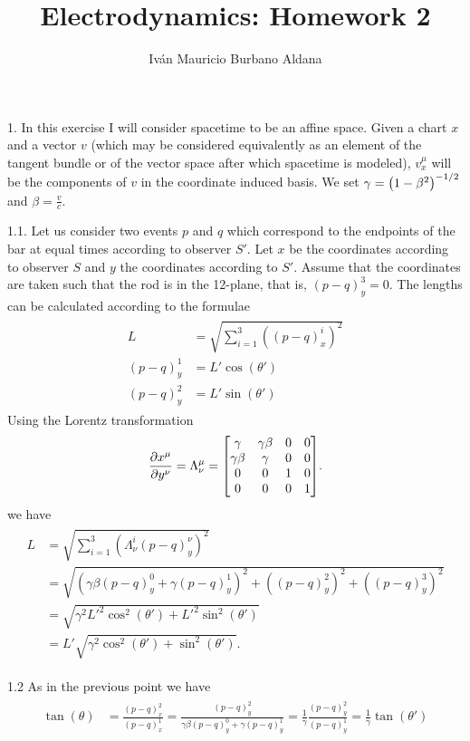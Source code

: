 \documentclass{article}
\title{Electrodynamics: Homework 2}
\author{Iván Mauricio Burbano Aldana}
\begin{document}
\maketitle

1. In this exercise I will consider spacetime to be an affine space. Given a chart $x$ and a vector $v$ (which may be considered equivalently as an element of the tangent bundle or of the vector space after which spacetime is modeled), $v^\mu_x$ will be the components of $v$ in the coordinate induced basis. We set $\gamma=\qty(1-\beta^2)^{-1/2}$ and $\beta=\frac{v}{c}$.

1.1. Let us consider two events $p$ and $q$ which correspond to the endpoints of the bar at equal times according to observer $S'$. Let $x$ be the coordinates according to observer $S$ and $y$ the coordinates according to $S'$. Assume that the coordinates are taken such that the rod is in the 12-plane, that is, $(p-q)^3_y=0$. The lengths can be calculated according to the formulae
\begin{align}
\begin{split}
L&=\sqrt{\sum_{i=1}^3 ((p-q)^i_x)^2}\\
(p-q)^1_y&=L'\cos(\theta')\\
(p-q)^2_y&=L'\sin(\theta')
\end{split}
\end{align}
Using the Lorentz transformation
\begin{equation}
\frac{\partial x^\mu}{\partial y^\nu}=\Lambda^\mu_\nu=\mqty[\gamma & \gamma\beta & 0 & 0 \\
\gamma\beta & \gamma & 0 & 0\\
0 & 0 & 1 & 0\\
0 & 0 & 0 & 1].
\end{equation}
we have
\begin{align}
\begin{split}
L&=\sqrt{\sum_{i=1}^3(\Lambda^i_\nu(p-q)^\nu_y)^2}\\
&=\sqrt{(\gamma\beta(p-q)^0_y+\gamma(p-q)^1_y)^2+((p-q)^2_y)^2+((p-q)^3_y)^2}\\
&=\sqrt{\gamma^2L'^2\cos^2(\theta')+L'^2\sin^2(\theta')}\\
&=L'\sqrt{\gamma^2\cos^2(\theta')+\sin^2(\theta')}.
\end{split}
\end{align}

1.2
As in the previous point we have
\begin{align}
\begin{split}
\tan(\theta)&=\frac{(p-q)^2_x}{(p-q)^1_x}=\frac{(p-q)^2_y}{\gamma\beta(p-q)^0_y+\gamma(p-q)^1_y}=\frac{1}{\gamma}\frac{(p-q)^2_y}{(p-q)^1_y}=\frac{1}{\gamma}\tan(\theta')
\end{split}
\end{align}
\end{document}

